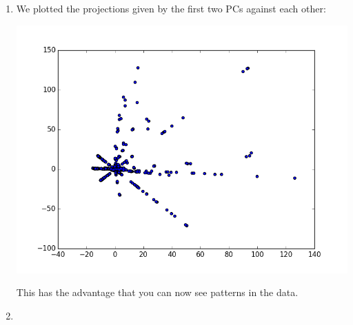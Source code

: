 \documentclass[12pt]{article}
\begin{document}
\begin{enumerate}[a]
	\item %
	We plotted the projections given by the first two PCs against each other:

	\includegraphics[width=\textwidth]{plot_1_2_2-d}

	This has the advantage that you can now see patterns in the data.

	\item %
\end{enumerate}
\end{document}
